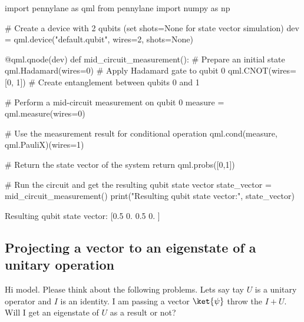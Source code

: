 \begin{python}
import pennylane as qml
from pennylane import numpy as np

# Create a device with 2 qubits (set shots=None for state vector simulation)
dev = qml.device("default.qubit", wires=2, shots=None)

@qml.qnode(dev)
def mid_circuit_measurement():
    # Prepare an initial state
    qml.Hadamard(wires=0)  # Apply Hadamard gate to qubit 0
    qml.CNOT(wires=[0, 1]) # Create entanglement between qubits 0 and 1

    # Perform a mid-circuit measurement on qubit 0
    measure = qml.measure(wires=0)

    # Use the measurement result for conditional operation
    qml.cond(measure, qml.PauliX)(wires=1)

    # Return the state vector of the system
    return qml.probs([0,1])

# Run the circuit and get the resulting qubit state vector
state_vector = mid_circuit_measurement()
print("Resulting qubit state vector:", state_vector)
\end{python}

\begin{result}
Resulting qubit state vector: [0.5 0.  0.5 0. ]
\end{result}


\subsection{Projecting a vector to an eigenstate of a unitary operation}


\begin{ai}
Hi model. Please think about the following problems. Lets say tay $U$ is a unitary operator and $I$
is an identity.  I am passing a vector $\ket{\psi}$ throw the $I + U$. Will I get an eigenstate of
$U$ as a result or not?
\end{ai}

